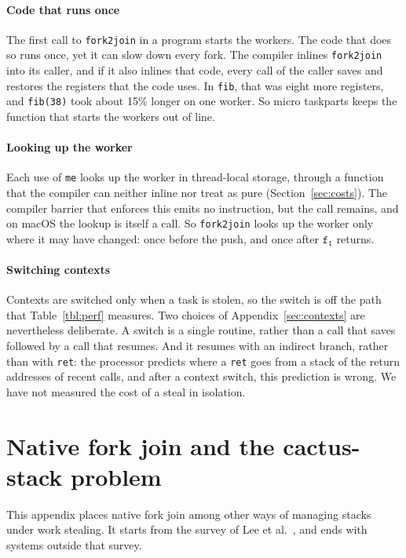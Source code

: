 \documentclass[sigplan,nonacm]{acmart}
\newcommand{\fo}{\mathtt{f_1}}
\begin{document}
\paragraph{Code that runs once}
%
The first call to \lstinline|fork2join| in a program starts the
workers.
%
The code that does so runs once, yet it can slow down every fork.
%
The compiler inlines \lstinline|fork2join| into its caller, and if it
also inlines that code, every call of the caller saves and restores
the registers that the code uses.
%
In \lstinline|fib|, that was eight more registers, and
\lstinline|fib(38)| took about 15\% longer on one worker.
%
So micro taskparts keeps the function that starts the workers out of
line.

\paragraph{Looking up the worker}
%
Each use of \lstinline|me| looks up the worker in thread-local storage,
through a function that the compiler can neither inline nor treat as
pure (Section~\ref{sec:costs}).
%
The compiler barrier that enforces this emits no instruction, but the
call remains, and on macOS the lookup is itself a call.
%
So \lstinline|fork2join| looks up the worker only where it may have
changed: once before the push, and once after $\fo$ returns.

\paragraph{Switching contexts}
%
Contexts are switched only when a task is stolen, so the switch is off
the path that Table~\ref{tbl:perf} measures.
%
Two choices of Appendix~\ref{sec:contexts} are nevertheless deliberate.
%
A switch is a single routine, rather than a call that saves followed
by a call that resumes.
%
And it resumes with an indirect branch, rather than with
\lstinline|ret|: the processor predicts where a \lstinline|ret| goes
from a stack of the return addresses of recent calls, and after a
context switch, this prediction is wrong.
%
We have not measured the cost of a steal in isolation.

\section{Native fork join and the cactus-stack problem}
\label{sec:lore}

This appendix places native fork join among other ways of managing
stacks under work stealing.
%
It starts from the survey of Lee et al.~\cite{lee2010cilk-m}, and ends
with systems outside that survey.
\end{document}
